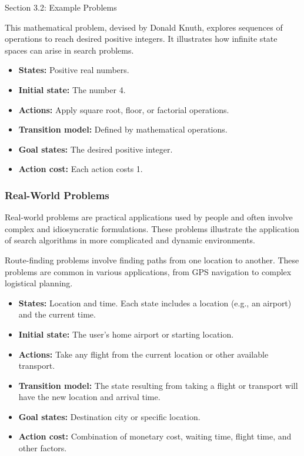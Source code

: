 \begin{notes}{Section 3.2: Example Problems}
    \begin{highlight}
        This mathematical problem, devised by Donald Knuth, explores sequences of operations to reach desired positive integers. It illustrates how infinite state spaces can arise in search problems.
    
        \begin{itemize}
            \item \textbf{States:} Positive real numbers.
            \item \textbf{Initial state:} The number 4.
            \item \textbf{Actions:} Apply square root, floor, or factorial operations.
            \item \textbf{Transition model:} Defined by mathematical operations.
            \item \textbf{Goal states:} The desired positive integer.
            \item \textbf{Action cost:} Each action costs 1.
        \end{itemize}
    \end{highlight}

    \subsubsection*{Real-World Problems}

    Real-world problems are practical applications used by people and often involve complex and idiosyncratic formulations. These problems illustrate the application of search algorithms in more 
    complicated and dynamic environments.

    \begin{highlight}
        Route-finding problems involve finding paths from one location to another. These problems are common in various applications, from GPS navigation to complex logistical planning.
    
        \begin{itemize}
            \item \textbf{States:} Location and time. Each state includes a location (e.g., an airport) and the current time.
            \item \textbf{Initial state:} The user's home airport or starting location.
            \item \textbf{Actions:} Take any flight from the current location or other available transport.
            \item \textbf{Transition model:} The state resulting from taking a flight or transport will have the new location and arrival time.
            \item \textbf{Goal states:} Destination city or specific location.
            \item \textbf{Action cost:} Combination of monetary cost, waiting time, flight time, and other factors.
        \end{itemize}
    \end{highlight}


\end{notes}
